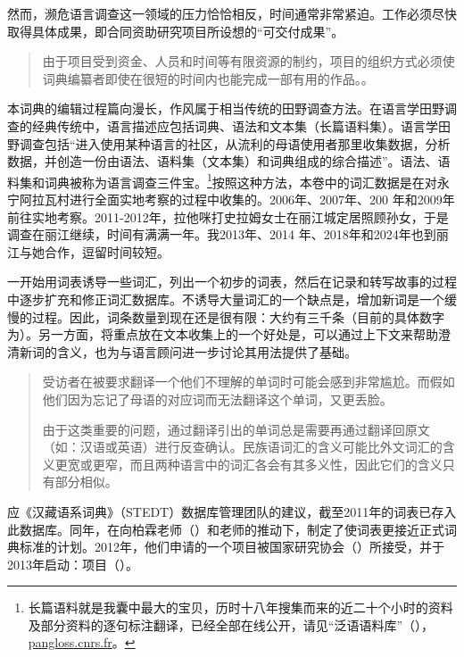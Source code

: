 然而，濒危语言调查这一领域的压力恰恰相反，时间通常非常紧迫。工作必须尽快取得具体成果，即合同资助研究项目所设想的“可交付成果”。
\begin{quotation}
    由于项目受到资金、人员和时间等有限资源的制约，项目的组织方式必须使词典编纂者即使在很短的时间内也能完成一部有用的作品。\parencite[“濒危语言社区的词典编纂”:][42]{mosel_dictionary_2004}。
\end{quotation}

本词典的编辑过程篇向漫长，作风属于相当传统的田野调查方法。在语言学田野调查的经典传统中，语言描述应包括词典、语法和文本集（长篇语料集）\parencite{michaud2012_yongning}。语言学田野调查包括“进入使用某种语言的社区，从流利的母语使用者那里收集数据，分析数据，并创造一份由语法、语料集（文本集）和词典组成的综合描述”\parencite[12]{dixon2007}。语法、语料集和词典被称为语言调查三件宝\parencite{sun2007}。\footnote{长篇语料就是我囊中最大的宝贝，历时十八年搜集而来的近二十个小时的资料及部分资料的逐句标注翻译，已经全部在线公开，请见“泛语语料库”（），\href{https://pangloss.cnrs.fr/}{pangloss.cnrs.fr}。}按照这种方法，本卷中的词汇数据是在对永宁阿拉瓦村进行全面实地考察的过程中收集的。2006年、2007年、200 年和2009年前往实地考察。2011-2012年，拉他咪打史拉姆女士在丽江城定居照顾孙女，于是调查在丽江继续，时间有满满一年。我2013年、2014 年、2018年和2024年也到丽江与她合作，逗留时间较短。

一开始用词表诱导一些词汇，列出一个初步的词表，然后在记录和转写故事的过程中逐步扩充和修正词汇数据库。不诱导大量词汇的一个缺点是，增加新词是一个缓慢的过程。因此，词条数量到现在还是很有限：大约有三千条（目前的具体数字为）。另一方面，将重点放在文本收集上的一个好处是，可以通过上下文来帮助澄清新词的含义，也为与语言顾问进一步讨论其用法提供了基础。

\begin{quotation}
    受访者在被要求翻译一个他们不理解的单词时可能会感到非常尴尬。而假如他们因为忘记了母语的对应词而无法翻译这个单词，又更丢脸。

    由于这类重要的问题，通过翻译引出的单词总是需要再通过翻译回原文（如：汉语或英语）进行反查确认。民族语词汇的含义可能比外文词汇的含义更宽或更窄，而且两种语言中的词汇各会有其多义性，因此它们的含义只有部分相似。\parencite[44]{mosel_dictionary_2004}
\end{quotation}

应《汉藏语系词典》（STEDT）数据库管理团队的建议，截至2011年的词表已存入此数据库\parencite{stedt}。同年，在向柏霖老师（）和老师的推动下，制定了使词表更接近正式词典标准的计划。2012年，他们申请的一个项目被国家研究协会（）所接受，并于2013年启动：项目（）。

